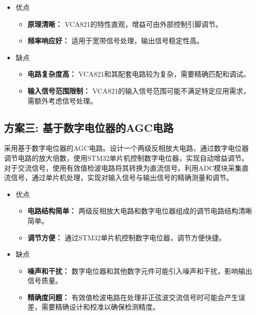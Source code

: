 \documentclass[lang=cn,11pt,a4paper]{elegantpaper}
\begin{document}
\begin{itemize}
  \item 优点
        \begin{itemize}
          \item \textbf{原理清晰：} VCA821的特性直观，增益可由外部控制引脚调节。
          \item \textbf{频率响应好：} 适用于宽带信号处理，输出信号稳定性高。
        \end{itemize}

  \item 缺点
        \begin{itemize}
          \item \textbf{电路复杂度高：} VCA821和其配套电路较为复杂，需要精确匹配和调试。
          \item \textbf{输入信号范围限制：} VCA821的输入信号范围可能不满足特定应用需求，需额外考虑信号处理。
        \end{itemize}
\end{itemize}

\subsection{方案三: 基于数字电位器的AGC电路}

采用基于数字电位器的AGC电路。设计一个两级反相放大电路，通过数字电位器调节电路的放大倍数，使用STM32单片机控制数字电位器，实现自动增益调节。对于交流信号，使用有效值检波电路将其转换为直流信号。利用ADC模块采集直流信号，通过单片机处理，实现对输入信号与输出信号的精确测量和调节。

\begin{itemize}
  \item  优点
        \begin{itemize}
          \item \textbf{电路结构简单：} 两级反相放大电路和数字电位器组成的调节电路结构清晰简单。
          \item \textbf{调节方便：} 通过STM32单片机控制数字电位器，调节方便快捷。
        \end{itemize}

  \item 缺点
        \begin{itemize}
          \item \textbf{噪声和干扰：} 数字电位器和其他数字元件可能引入噪声和干扰，影响输出信号质量。
          \item \textbf{精确度问题：} 有效值检波电路在处理非正弦波交流信号时可能会产生误差，需要精确设计和校准以确保检测精度。
        \end{itemize}
\end{itemize}
\end{document}

